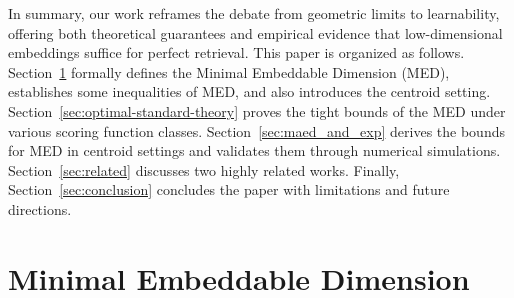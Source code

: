 In summary, our work reframes the debate from geometric limits to learnability, offering both theoretical guarantees and empirical evidence that low-dimensional embeddings suffice for perfect retrieval.
This paper is organized as follows. Section~\ref{sec:problem-definition} formally defines the Minimal Embeddable Dimension (MED), establishes some inequalities of MED, and also introduces the centroid setting. Section~\ref{sec:optimal-standard-theory} proves the tight bounds of the MED under various scoring function classes. Section~\ref{sec:maed_and_exp} derives the bounds for MED in centroid settings and validates them through numerical simulations. Section~\ref{sec:related} discusses two highly related works. Finally, Section~\ref{sec:conclusion} concludes the paper with limitations and future directions.

\section{Minimal Embeddable Dimension}\label{sec:problem-definition}

